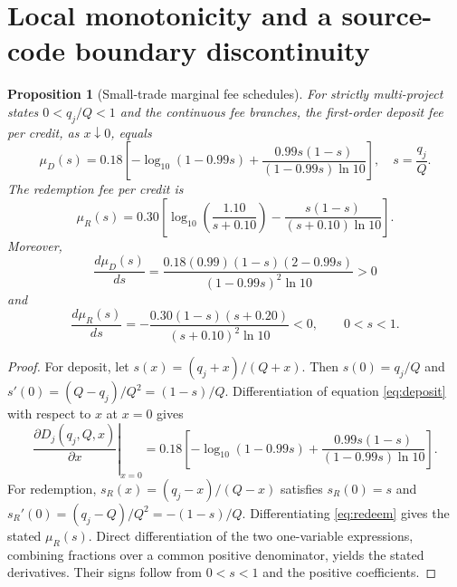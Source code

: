 \documentclass[11pt]{article}
\newtheorem{proposition}{Proposition}
\begin{document}
\section{Local monotonicity and a source-code boundary discontinuity}
\begin{proposition}[Small-trade marginal fee schedules]
\label{prop:marginal}
For strictly multi-project states $0<q_j/Q<1$ and the continuous fee branches, the first-order deposit fee per credit, as $x\downarrow0$, equals
\begin{equation}
\mu_D(s)=0.18\left[-\log_{10}(1-0.99s)+\frac{0.99s(1-s)}{(1-0.99s)\ln10}\right],
\quad s=\frac{q_j}{Q}.
\end{equation}
The redemption fee per credit is
\begin{equation}
\mu_R(s)=0.30\left[\log_{10}\left(\frac{1.10}{s+0.10}\right)-\frac{s(1-s)}{(s+0.10)\ln10}\right].
\end{equation}
Moreover,
\begin{equation}
\frac{d\mu_D(s)}{ds}
=\frac{0.18(0.99)(1-s)(2-0.99s)}{(1-0.99s)^2\ln10}>0
\end{equation}
and
\begin{equation}
\frac{d\mu_R(s)}{ds}
=-\frac{0.30(1-s)(s+0.20)}{(s+0.10)^2\ln10}<0,
\qquad 0<s<1.
\end{equation}
\end{proposition}
\begin{proof}
For deposit, let $s(x)=(q_j+x)/(Q+x)$. Then $s(0)=q_j/Q$ and $s'(0)=(Q-q_j)/Q^2=(1-s)/Q$. Differentiation of equation \eqref{eq:deposit} with respect to $x$ at $x=0$ gives
\[
\left.\frac{\partial D_j(q_j,Q,x)}{\partial x}\right|_{x=0}
=0.18\left[-\log_{10}(1-0.99s)+\frac{0.99s(1-s)}{(1-0.99s)\ln10}\right].
\]
For redemption, $s_R(x)=(q_j-x)/(Q-x)$ satisfies $s_R(0)=s$ and $s_R'(0)=(q_j-Q)/Q^2=-(1-s)/Q$. Differentiating \eqref{eq:redeem} gives the stated $\mu_R(s)$. Direct differentiation of the two one-variable expressions, combining fractions over a common positive denominator, yields the stated derivatives. Their signs follow from $0<s<1$ and the positive coefficients.
\end{proof}
\end{document}
